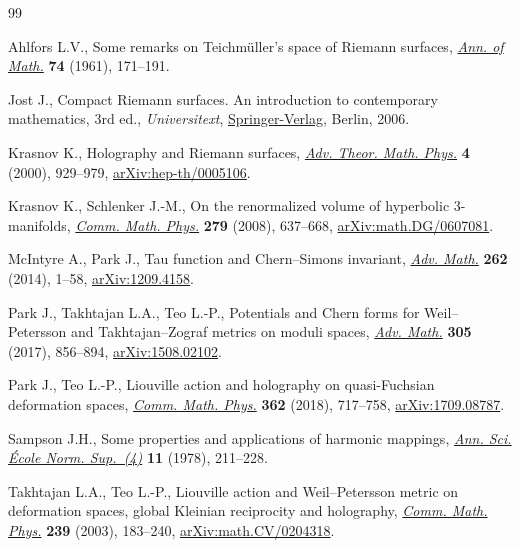 \documentclass[10pt,a4paper]{amsart}
\numberwithin{equation}{section}
\begin{document}
\begin{thebibliography}{99}
\footnotesize\itemsep=0pt

Ahlfors L.V., Some remarks on {T}eichm\"uller's space of {R}iemann surfaces,
 \href{https://doi.org/10.2307/1970309}{\textit{Ann. of Math.}} \textbf{74} (1961), 171--191.

Jost J., Compact {R}iemann surfaces. An introduction to contemporary
 mathematics, 3rd ed., \textit{Universitext}, \href{https://doi.org/10.1007/978-3-540-33067-7}{Springer-Verlag}, Berlin, 2006.

Krasnov K., Holography and {R}iemann surfaces, \href{https://doi.org/10.4310/ATMP.2000.v4.n4.a5}{\textit{Adv. Theor. Math. Phys.}}
 \textbf{4} (2000), 929--979, \href{https://arxiv.org/abs/hep-th/0005106}{arXiv:hep-th/0005106}.

Krasnov K., Schlenker J.-M., On the renormalized volume of hyperbolic
 3-manifolds, \href{https://doi.org/10.1007/s00220-008-0423-7}{\textit{Comm. Math. Phys.}} \textbf{279} (2008), 637--668,
 \href{https://arxiv.org/abs/math.DG/0607081}{arXiv:math.DG/0607081}.

McIntyre A., Park J., Tau function and {C}hern--{S}imons invariant,
 \href{https://doi.org/10.1016/j.aim.2014.05.005}{\textit{Adv. Math.}} \textbf{262} (2014), 1--58, \href{https://arxiv.org/abs/1209.4158}{arXiv:1209.4158}.

Park J., Takhtajan L.A., Teo L.-P., Potentials and {C}hern forms for
 {W}eil--{P}etersson and {T}akhtajan--{Z}ograf metrics on moduli spaces,
 \href{https://doi.org/10.1016/j.aim.2016.10.002}{\textit{Adv. Math.}} \textbf{305} (2017), 856--894, \href{https://arxiv.org/abs/1508.02102}{arXiv:1508.02102}.

Park J., Teo L.-P., Liouville action and holography on quasi-{F}uchsian
 deformation spaces, \href{https://doi.org/10.1007/s00220-018-3164-2}{\textit{Comm. Math. Phys.}} \textbf{362} (2018), 717--758,
 \href{https://arxiv.org/abs/1709.08787}{arXiv:1709.08787}.

Sampson J.H., Some properties and applications of harmonic mappings,
 \href{https://doi.org/10.24033/asens.1344}{\textit{Ann. Sci. \'Ecole Norm. Sup.~(4)}} \textbf{11} (1978), 211--228.

Takhtajan L.A., Teo L.-P., Liouville action and {W}eil--{P}etersson metric on
 deformation spaces, global {K}leinian reciprocity and holography,
 \href{https://doi.org/10.1007/s00220-003-0878-5}{\textit{Comm. Math. Phys.}} \textbf{239} (2003), 183--240,
 \href{https://arxiv.org/abs/math.CV/0204318}{arXiv:math.CV/0204318}.


\end{thebibliography}
\end{document}
